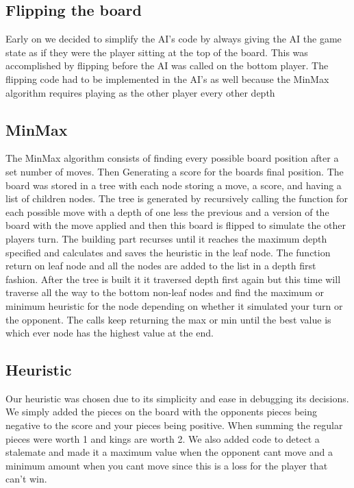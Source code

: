 \documentclass[12pt]{article}
\begin{document}
	\subsection{Flipping the board}
Early on we decided to simplify the AI's code by always giving the AI the game state as if they were the player sitting at the top of the board. This was accomplished by flipping before the AI was called on the bottom player.		The flipping code had to be implemented in the AI's as well because the MinMax algorithm requires playing as the other player every other depth
	
	\subsection{MinMax}
The MinMax algorithm consists of finding every possible board position after a set number of moves. Then Generating a score for the boards final position. The board was stored in a tree with each node storing a move, a score, and having a list of children nodes. The tree is generated by recursively calling the function for each possible move with a depth of one less the previous and a version of the board with the move applied and then this board is flipped to simulate the other players turn. The building part recurses until it reaches the maximum depth specified and calculates and saves the heuristic in the leaf node. The function return on leaf node and all the nodes are added to the list in a depth first fashion. After the tree is built it it traversed depth first again but this time will traverse all the way to the bottom non-leaf nodes and find the maximum or minimum heuristic for the node depending on whether it simulated your turn or the opponent. The calls keep returning the max or min until the best value is which ever node has the highest value at the end.
	
	\subsection{Heuristic}
Our heuristic was chosen due to its simplicity and ease in debugging its decisions. We simply added the pieces on the board with the opponents pieces being negative to the score and your pieces being positive. When summing the regular pieces were worth 1 and kings are worth 2. We also added code to detect a stalemate and made it a maximum value when the opponent cant move and a minimum amount when you cant move since this is a loss for the player that can't win. 
\end{document}
